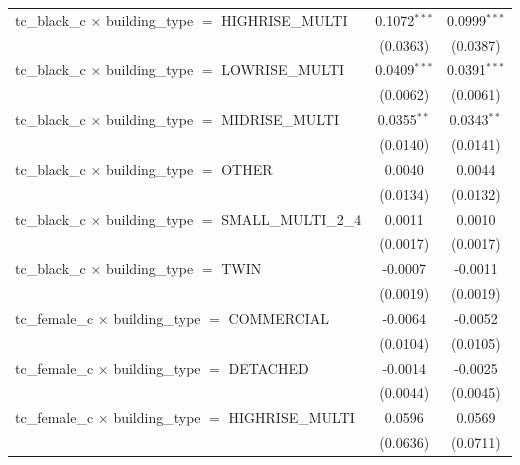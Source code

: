 \begin{tabular}{lcc}
   tc\_black\_c $\times$ building\_type $=$ HIGHRISE\_MULTI            & 0.1072$^{***}$         & 0.0999$^{***}$\\   
                                                                       & (0.0363)               & (0.0387)\\   
   tc\_black\_c $\times$ building\_type $=$ LOWRISE\_MULTI             & 0.0409$^{***}$         & 0.0391$^{***}$\\   
                                                                       & (0.0062)               & (0.0061)\\   
   tc\_black\_c $\times$ building\_type $=$ MIDRISE\_MULTI             & 0.0355$^{**}$          & 0.0343$^{**}$\\   
                                                                       & (0.0140)               & (0.0141)\\   
   tc\_black\_c $\times$ building\_type $=$ OTHER                      & 0.0040                 & 0.0044\\   
                                                                       & (0.0134)               & (0.0132)\\   
   tc\_black\_c $\times$ building\_type $=$ SMALL\_MULTI\_2\_4         & 0.0011                 & 0.0010\\   
                                                                       & (0.0017)               & (0.0017)\\   
   tc\_black\_c $\times$ building\_type $=$ TWIN                       & -0.0007                & -0.0011\\   
                                                                       & (0.0019)               & (0.0019)\\   
   tc\_female\_c $\times$ building\_type $=$ COMMERCIAL                & -0.0064                & -0.0052\\   
                                                                       & (0.0104)               & (0.0105)\\   
   tc\_female\_c $\times$ building\_type $=$ DETACHED                  & -0.0014                & -0.0025\\   
                                                                       & (0.0044)               & (0.0045)\\   
   tc\_female\_c $\times$ building\_type $=$ HIGHRISE\_MULTI           & 0.0596                 & 0.0569\\   
                                                                       & (0.0636)               & (0.0711)\\   

\end{tabular}
